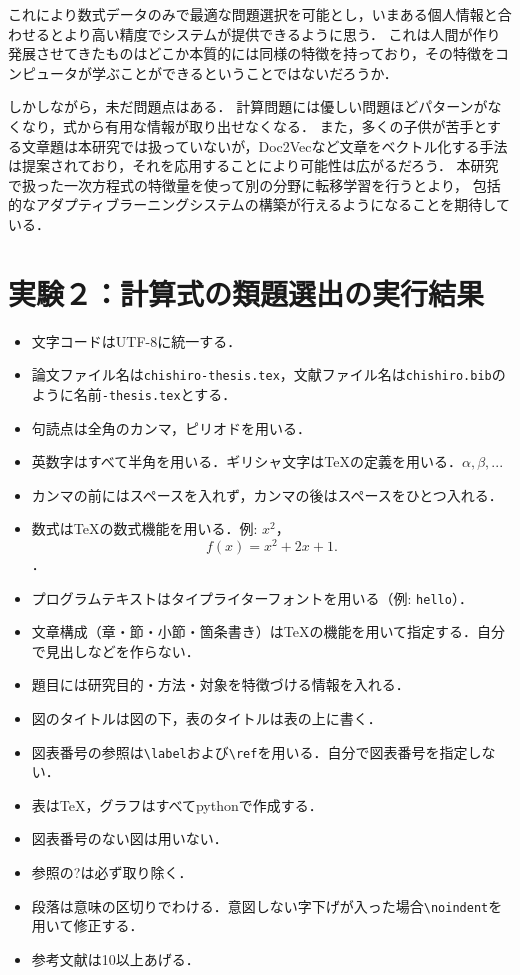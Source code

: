 \documentclass[a4j,11pt,report]{jsbook}
\begin{document}
これにより数式データのみで最適な問題選択を可能とし，いまある個人情報と合わせるとより高い精度でシステムが提供できるように思う．
これは人間が作り発展させてきたものはどこか本質的には同様の特徴を持っており，その特徴をコンピュータが学ぶことができるということではないだろうか．

しかしながら，未だ問題点はある．
計算問題には優しい問題ほどパターンがなくなり，式から有用な情報が取り出せなくなる．
また，多くの子供が苦手とする文章題は本研究では扱っていないが，Doc2Vecなど文章をベクトル化する手法は提案されており，それを応用することにより可能性は広がるだろう．
本研究で扱った一次方程式の特徴量を使って別の分野に転移学習を行うとより，
包括的なアダプティブラーニングシステムの構築が行えるようになることを期待している．



\appendix

\chapter{実験２：計算式の類題選出の実行結果\label{ch:sub}}
\begin{itemize}
  \item 文字コードはUTF-8に統一する．
  \item 論文ファイル名は\texttt{chishiro-thesis.tex}，文献ファイル名は\texttt{chishiro.bib}のように名前\texttt{-thesis.tex}とする．
  \item 句読点は全角のカンマ，ピリオドを用いる．
  \item 英数字はすべて半角を用いる．ギリシャ文字は{\TeX}の定義を用いる．$\alpha, \beta, ...$
  \item カンマの前にはスペースを入れず，カンマの後はスペースをひとつ入れる．
  \item 数式は{\TeX}の数式機能を用いる．例: $x^2$，\[f(x) = x^2 + 2x + 1.\]．
  \item プログラムテキストはタイプライターフォントを用いる（例: \texttt{hello}）．
  \item 文章構成（章・節・小節・箇条書き）は{\TeX}の機能を用いて指定する．自分で見出しなどを作らない．
  \item 題目には研究目的・方法・対象を特徴づける情報を入れる．
  \item 図のタイトルは図の下，表のタイトルは表の上に書く．
  \item 図表番号の参照は\verb#\label#および\verb#\ref#を用いる．自分で図表番号を指定しない．
  \item 表は{\TeX}，グラフはすべてpythonで作成する．
  \item 図表番号のない図は用いない．
  \item 参照の?は必ず取り除く．
  \item 段落は意味の区切りでわける．意図しない字下げが入った場合\verb#\noindent#を用いて修正する．
  \item 参考文献は10以上あげる．
\end{itemize}
\fi
\end{document}
